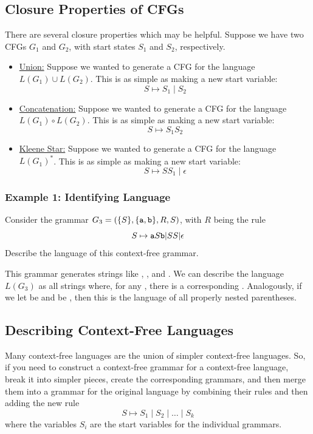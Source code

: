 \documentclass[letterpaper]{article}
\begin{document}
\subsection{Closure Properties of CFGs}
There are several closure properties which may be helpful. Suppose we have two CFGs $G_1$ and $G_2$, with start states $S_1$ and $S_2$, respectively. 
\begin{itemize}
    \item \underline{Union:} Suppose we wanted to generate a CFG for the language $L(G_1) \cup L(G_2)$. This is as simple as making a new start variable: 
    \[S \mapsto S_1 \mid S_2\]

    \item \underline{Concatenation:} Suppose we wanted to generate a CFG for the language $L(G_1) \circ L(G_2)$. This is as simple as making a new start variable:
    \[S \mapsto S_1 S_2\]

    \item \underline{Kleene Star:} Suppose we wanted to generate a CFG for the language $L(G_1)^*$. This is as simple as making a new start variable:
    \[S \mapsto S S_1 \mid \epsilon\]
\end{itemize}

\subsubsection{Example 1: Identifying Language}
Consider the grammar $G_3 = (\{S\}, \{\texttt{a}, \texttt{b}\}, R, S)$, with $R$ being the rule 
\[S \mapsto \texttt{a}S\texttt{b} | SS | \epsilon\]
Describe the language of this context-free grammar. 

\begin{mdframed}[]
    This grammar generates strings like , , and . We can describe the language $L(G_3)$ as all strings where, for any , there is a corresponding . Analogously, if we let  be \code{(} and  be \code{)}, then this is the language of all properly nested parentheses. 
\end{mdframed}

\subsection{Describing Context-Free Languages}
Many context-free languages are the union of simpler context-free languages. So, if you need to construct a context-free grammar for a context-free language, break it into simpler pieces, create the corresponding grammars, and then merge them into a grammar for the original language by combining their rules and then adding the new rule 
    \[S \mapsto S_1 \mid S_2 \mid \dots \mid S_k\]
where the variables $S_i$ are the start variables for the individual grammars. 
\end{document}
